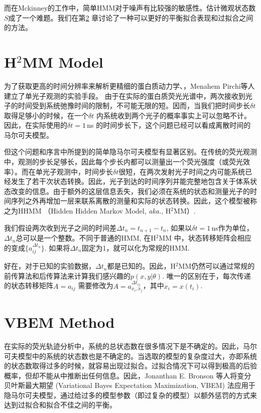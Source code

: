 \documentclass[11pt, a4paper]{article}
\begin{document}
而在Mckinney的工作中，简单HMM对于噪声有比较强的敏感性。估计微观状态数$S$成了一个难题。我们在第\ref{chapter:VBEM} 章讨论了一种可以更好的平衡拟合表现和过拟合之间的方法。


\section{H$^2$MM Model}\label{chapter:H2MM}

    为了获取更高的时间分辨率来解析更精细的蛋白质动力学、，Menahem Pirchi等人建立了单光子观测的实验手段\cite{H2MM}。 由于在实际的蛋白质荧光光谱中，两次接收到光子的时间受到系统弛豫时间的限制，不可能无限的短。因而，当我们把时间步长$\delta t$ 取得足够小的时候，在一个$\delta t$ 内系统收到两个光子的概率事实上可以忽略不计。因此，在实际使用的$\delta t = 1\,$ns 的时间步长下，这个问题已经可以看成离散时间的马尔可夫模型。

    但这个问题和序言中所提到的简单隐马尔可夫模型有显著区别。在传统的荧光观测中，观测的步长足够长，因此每个步长内都可以测量出一个荧光强度（或荧光效率）。而在单光子观测中，时间步长$\delta t$很短，在两次发射光子时间之内可能系统已经发生了若干次状态转换。因此，光子到达的时间序列并能完整地包含关于体系状态改变的信息。由于额外的这层信息丢失，我们必须在系统的状态和测量光子的时间序列之外再增加一层来联系离散的测量和实际的状态转换。因此，这个模型被称之为HHMM （Hidden Hidden Markov Model, \emph{aka.}, H$^2$MM）.

    我们假设两次收到光子之间的时间差$\Delta t_n = t_{n+1}-t_n$, 如果以$\delta t=1\,$ns作为单位，$\Delta t_n$总可以是一个整数。不同于普通的HMM, 在H$^2$MM 中，状态转移矩阵会相应的变成$\{a_{ij}^{\Delta t_n}\}$. 如果将$\Delta t_n$固定为1，就可以化为常规的HMM.

    好在，对于已知的实验数据，$\Delta t_n$都是已知的。因此，H$^2$MM仍然可以通过常规的前传算法和后传算法来计算我们感兴趣的$p(x,y|\theta)$. 唯一的区别在于，每次传递的状态转移矩阵$A=a_{ij}$ 需要修改为$A=a^{\Delta t_{ij}}_{x_i, x_j}$，其中$x_i=x(t_i)$.







\section{VBEM Method}\label{chapter:VBEM}

    在实际的荧光轨迹分析中，系统的总状态数在很多情况下是不确定的。因此，马尔可夫模型中的系统的状态数也是不确定的。当选取的模型的复杂度过大，亦即系统的状态数取得过多的时候，就容易出现过拟合。过拟合情况下可以得到极高的后验概率，但却不能从中推断出任何信息。因此，Jonanthan E. Bronson 等人将变分贝叶斯最大期望 (Variational Bayes Expectation Maximization, VBEM) 法应用于隐马尔可夫模型\cite{VBEM}，通过给过多的模型参数（即过复杂的模型）以额外惩罚的方式来达到过拟合和拟合不佳之间的平衡。
\end{document}
